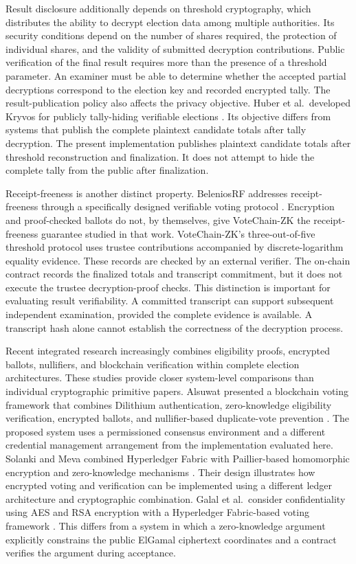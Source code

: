 \label{subsec:related-threshold}
Result disclosure additionally depends on threshold cryptography, which distributes the ability to decrypt election data among multiple authorities. Its security conditions depend on the number of shares required, the protection of individual shares, and the validity of submitted decryption contributions. Public verification of the final result requires more than the presence of a threshold parameter. An examiner must be able to determine whether the accepted partial decryptions correspond to the election key and recorded encrypted tally. The result-publication policy also affects the privacy objective. Huber et al.\ developed Kryvos for publicly tally-hiding verifiable elections \citep{huber2022kryvos}. Its objective differs from systems that publish the complete plaintext candidate totals after tally decryption. The present implementation publishes plaintext candidate totals after threshold reconstruction and finalization. It does not attempt to hide the complete tally from the public after finalization.

Receipt-freeness is another distinct property. BeleniosRF addresses receipt-freeness through a specifically designed verifiable voting protocol \citep{chaidos2016beleniosrf}. Encryption and proof-checked ballots do not, by themselves, give VoteChain-ZK the receipt-freeness guarantee studied in that work. VoteChain-ZK's three-out-of-five threshold protocol uses trustee contributions accompanied by discrete-logarithm equality evidence. These records are checked by an external verifier. The on-chain contract records the finalized totals and transcript commitment, but it does not execute the trustee decryption-proof checks. This distinction is important for evaluating result verifiability. A committed transcript can support subsequent independent examination, provided the complete evidence is available. A transcript hash alone cannot establish the correctness of the decryption process.

\label{subsec:related-integrated-systems}
Recent integrated research increasingly combines eligibility proofs, encrypted ballots, nullifiers, and blockchain verification within complete election architectures. These studies provide closer system-level comparisons than individual cryptographic primitive papers. Alsuwat presented a blockchain voting framework that combines Dilithium authentication, zero-knowledge eligibility verification, encrypted ballots, and nullifier-based duplicate-vote prevention \citep{alsuwat2026voting}. The proposed system uses a permissioned consensus environment and a different credential management arrangement from the implementation evaluated here. Solanki and Meva combined Hyperledger Fabric with Paillier-based homomorphic encryption and zero-knowledge mechanisms \citep{solanki2026hybrid}. Their design illustrates how encrypted voting and verification can be implemented using a different ledger architecture and cryptographic combination. Galal et al.\ consider confidentiality using AES and RSA encryption with a Hyperledger Fabric-based voting framework \citep{galal2026framework}. This differs from a system in which a zero-knowledge argument explicitly constrains the public ElGamal ciphertext coordinates and a contract verifies the argument during acceptance.

